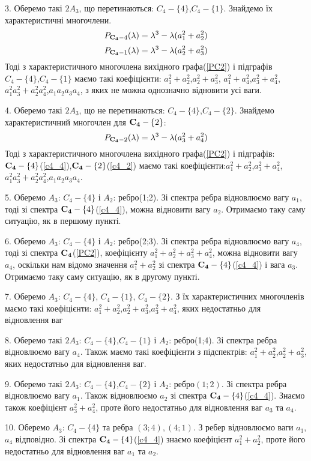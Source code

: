 3. Оберемо  такі $2A_3$, що перетинаються: $C_4-\{4\}$,$C_4-\{1\}$. 
Знайдемо їх характеристичні многочлени.
\begin{equation}\label{c4_4}
P_{{\bf C_4}-{4}}(\lambda) = \lambda^3 - \lambda(a_1^2+a_2^2)
\end{equation}
\begin{equation}
    P_{{\bf C_4}-{1}}(\lambda) = \lambda^3 - \lambda(a_2^2+a_3^2)
\end{equation}
Тоді з характеристичного многочлена вихідного графа(\ref{PC2}) і підграфів\\ $C_4-\{4\}$,$C_4-\{1\}$ маємо такі коефіцієнти: $a_1^2+a_2^2$,$a_2^2+a_3^2$,
$a_1^2+a_4^2$,$a_3^2+a_4^2$,$a_1^2a_3^2+a_2^2a_4^2$,$a_1a_2a_3a_4$, з яких не можна однозначно відновити усі ваги.

4. Оберемо  такі $2A_3$, що не перетинаються: $C_4-\{4\}$,$C_4-\{2\}$. 
Знайдемо характеристичний многочлен для ${\bf C_4}-\{2\}$:
\begin{equation}\label{c4_2}
    P_{{\bf C_4}-{2}}(\lambda) = \lambda^3 - \lambda(a_3^2+a_4^2)
\end{equation}
Тоді з характеристичного многочлена вихідного графа(\ref{PC2}) і підграфів:\\ ${\bf C_4}-\{4\}$(\ref{c4_4}),${\bf C_4}-\{2\}$(\ref{c4_2}) маємо такі коефіцієнти:$a_1^2+a_2^2$,$a_3^2+a_4^2$,
$a_1^2a_3^2+a_2^2a_4^2$,$a_1a_2a_3a_4$.

5. Оберемо $A_3$: $C_4-\{4\}$ і $A_2$: ребро(1;2). Зі спектра ребра відновлюємо вагу $a_1$, тоді зі  спектра ${\bf C_4}-\{4\}$(\ref{c4_4}), можна відновити вагу $a_2$.
Отримаємо таку саму ситуацію, як в першому пункті.

6. Оберемо $A_3$: $C_4-\{4\}$ і $A_2$: ребро(2;3). Зі спектра ребра відновлюємо вагу $a_4$, тоді зі  спектра $\bf C_4$(\ref{PC2}), коефіцієнту $a_1^2+a_2^2+a_3^2+a_4^2$, можна відновити вагу $a_4$, оскільки нам відомо значення $a_1^2+a_2^2$ зі спектра ${\bf C_4}-\{4\}$(\ref{c4_4}) і вага $a_3$. Отримаємо таку саму ситуацію, як в другому пункті.

7. Оберемо $A_3$: $C_4-\{4\}$, $C_4-\{1\}$, $C_4-\{2\}$. З їх характеристичних многочленів маємо такі коефіцієнти: $a_1^2+a_2^2$,$a_2^2+a_3^2$,$a_3^2+a_4^2$, яких недостатньо для відновлення ваг

8. Оберемо  такі $2A_3$: $C_4-\{4\}$,$C_4-\{1\}$ і $A_2$: ребро(1;4). Зі спектра ребра відновлюємо вагу $a_4$. Також маємо такі коефіцієнти з підспектрів:
$a_1^2+a_2^2$,$a_2^2+a_3^2$, яких недостатньо для відновлення ваг.

9. Оберемо  такі $2A_3$: $C_4-\{4\}$,$C_4-\{2\}$ і $A_2$: ребро$(1;2)$. Зі спектра ребра відновлюємо вагу $a_1$. Також відновлюємо $a_2$ зі спектра ${\bf C_4}-\{4\}$(\ref{c4_4}). Знаємо також коефіцієнт $a_3^2+a_4^2$, проте його недостатньо для відновлення ваг $a_3$ та $a_4$. 

10. Оберемо $A_3$: $C_4-\{4\}$ та ребра $(3;4),(4;1)$. З ребер відновлюємо ваги $a_3$,$a_4$ відповідно. Зі спектра ${\bf C_4}-\{4\}$(\ref{c4_4}) знаємо коефіцієнт $a_1^2+a_2^2$, проте його недостатньо для відновлення ваг $a_1$ та $a_2$.

